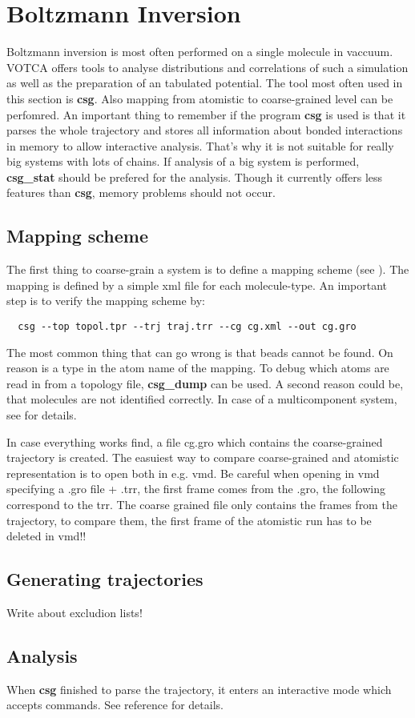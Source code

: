 \section{Boltzmann Inversion}
Boltzmann inversion is most often performed on a single molecule in vaccuum. VOTCA offers tools to analyse distributions and correlations of such a simulation as well as the preparation of an tabulated potential. The tool most often used in this section is \textbf{csg}. Also mapping from atomistic to coarse-grained level can be perfomred. An important thing to remember if the program \textbf{csg} is used is that it parses the whole trajectory and stores all information about bonded interactions in memory to allow interactive analysis. That's why it is not suitable for really big systems with lots of chains. If analysis of a big system is performed, \textbf{csg\_stat} should be prefered for the analysis. Though it currently offers less features than \textbf{csg}, memory problems should not occur.

\subsection{Mapping scheme}
The first thing to coarse-grain a system is to define a mapping scheme (see ). The mapping is defined by a simple xml file for each molecule-type. An important step is to verify the mapping scheme by:

\begin{verbatim}
  csg --top topol.tpr --trj traj.trr --cg cg.xml --out cg.gro
\end{verbatim}

The most common thing that can go wrong is that beads cannot be found. On reason is a type in the atom name of the mapping. To debug which atoms are read in from a topology file, \textbf{csg\_dump} can be used. A second reason could be, that molecules are not identified correctly. In case of a multicomponent system, see  for details.

In case everything works find, a file cg.gro which contains the coarse-grained trajectory is created. The easuiest way to compare coarse-grained and atomistic representation is to open both in e.g. vmd.  Be careful when opening in vmd specifying a .gro file + .trr, the first frame comes from the .gro, the following correspond to the trr. The coarse grained file only contains the frames from the trajectory, to compare them, the first frame of the atomistic run has to be deleted in vmd!!

\subsection{Generating trajectories}
Write about excludion lists!

\subsection{Analysis}
When \textbf{csg} finished to parse the trajectory, it enters an interactive mode which accepts commands. See reference for details.
